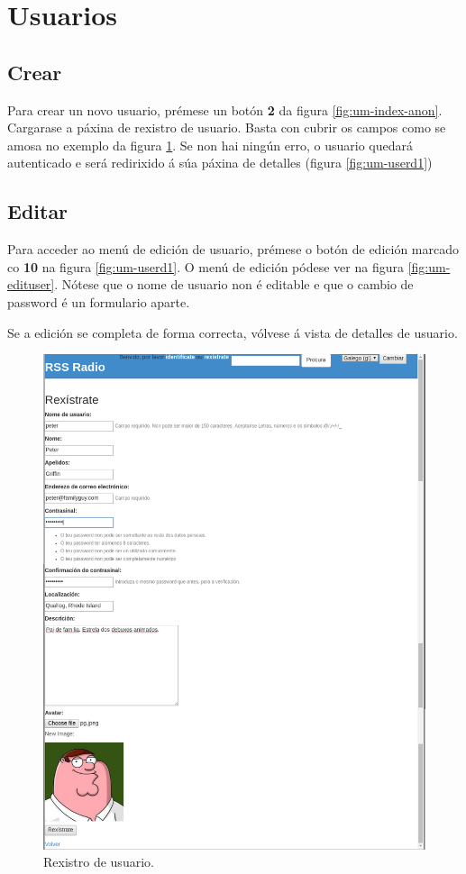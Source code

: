 \section{Usuarios}

\subsection{Crear}
Para crear un novo usuario, prémese un botón \textbf{2} da figura \ref{fig:um-index-anon}. Cargarase a páxina de rexistro de usuario. Basta con cubrir os campos como se amosa no exemplo da figura \ref{fig:um-signup}. Se non hai ningún erro, o usuario quedará autenticado e será redirixido á súa páxina de detalles (figura \ref{fig:um-userd1})



\subsection{Editar}
Para acceder ao menú de edición de usuario, prémese o botón de edición marcado co \textbf{10} na figura \ref{fig:um-userd1}. O menú de edición pódese ver na figura \ref{fig:um-edituser}. Nótese que o nome de usuario non é editable e que o cambio de password é un formulario aparte.

Se a edición se completa de forma correcta, vólvese á vista de detalles de usuario.

\begin{figure}[H]
	\centering
	\includegraphics[scale=0.43,keepaspectratio=true]{./images/usermanual/um-signup.png}
	\caption{Rexistro de usuario.}
	\label{fig:um-signup}
\end{figure}


